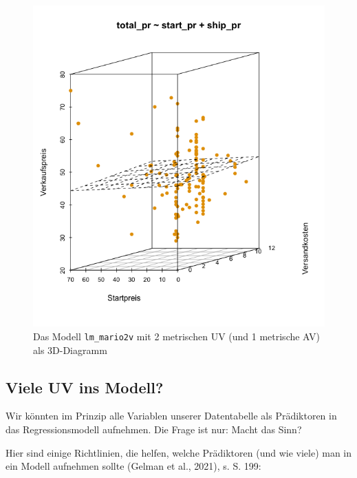 \documentclass[
  a4paper,
]{scrbook}
\theoremstyle{definition}
\theoremstyle{definition}
\theoremstyle{definition}
\theoremstyle{remark}
\begin{document}
\begin{figure}
\begin{minipage}{0.33\linewidth}
\end{minipage}%
%
\begin{minipage}{0.33\linewidth}

\includegraphics{img/3d_scatter_mario3.png}

\end{minipage}%

\caption{\label{fig-3d-regr-statisch}Das Modell \texttt{lm\_mario2v} mit
2 metrischen UV (und 1 metrische AV) als 3D-Diagramm}

\end{figure}%

\subsection{Viele UV ins Modell?}\label{viele-uv-ins-modell}

Wir könnten im Prinzip alle Variablen unserer Datentabelle als
Prädiktoren in das Regressionsmodell aufnehmen. Die Frage ist nur: Macht
das Sinn?

Hier sind einige Richtlinien, die helfen, welche Prädiktoren (und wie
viele) man in ein Modell aufnehmen sollte (Gelman et al., 2021), s. S.
199:
\end{document}
